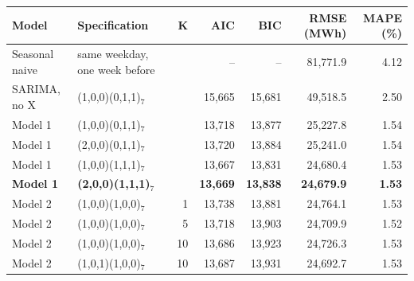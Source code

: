 \begin{tabular}{llrrrrr}
\toprule
Model & Specification & K & AIC & BIC & RMSE (MWh) & MAPE (\%) \\
\midrule
Seasonal naive & same weekday, one week before &  & -- & -- & 81,771.9 & 4.12 \\
SARIMA, no X & (1,0,0)(0,1,1)$_{7}$ &  & 15,665 & 15,681 & 49,518.5 & 2.50 \\
Model 1 & (1,0,0)(0,1,1)$_{7}$ &  & 13,718 & 13,877 & 25,227.8 & 1.54 \\
Model 1 & (2,0,0)(0,1,1)$_{7}$ &  & 13,720 & 13,884 & 25,241.0 & 1.54 \\
Model 1 & (1,0,0)(1,1,1)$_{7}$ &  & 13,667 & 13,831 & 24,680.4 & 1.53 \\
\textbf{Model 1} & \textbf{(2,0,0)(1,1,1)$_{7}$} & \textbf{} & \textbf{13,669} & \textbf{13,838} & \textbf{24,679.9} & \textbf{1.53} \\
Model 2 & (1,0,0)(1,0,0)$_{7}$ & 1 & 13,738 & 13,881 & 24,764.1 & 1.53 \\
Model 2 & (1,0,0)(1,0,0)$_{7}$ & 5 & 13,718 & 13,903 & 24,709.9 & 1.52 \\
Model 2 & (1,0,0)(1,0,0)$_{7}$ & 10 & 13,686 & 13,923 & 24,726.3 & 1.53 \\
Model 2 & (1,0,1)(1,0,0)$_{7}$ & 10 & 13,687 & 13,931 & 24,692.7 & 1.53 \\
\bottomrule
\end{tabular}
